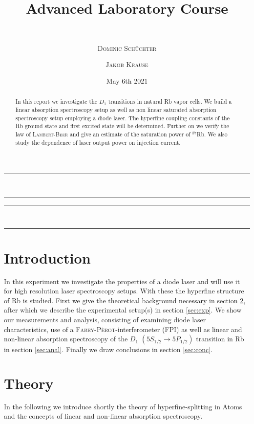 \documentclass[11pt,a4paper,notitlepage]{scrartcl}
\title{ Advanced Laboratory Course}
\subtitle{\name  \\ \hrulefill}
\date{May 6th 2021 \\}
\author[*]{\textsc{Dominic Schüchter}}
\author[$\dagger$]{\textsc{Jakob Krause}}
\affil[*]{\href{mailto:dschuechter@uni-bonn.de}{\faEnvelope  \hspace*{0.1cm}\texttt{dschuechter@uni-bonn.de}} {\color{black}$|$} \href{https://github.com/dschuechter}{\faGithub  \hspace*{0.1cm}\texttt{dschuechter}}}
\affil[$\dagger$]{\href{mailto:krause.jakob@uni-bonn.de}{\faEnvelope  \hspace*{0.1cm}\texttt{krause.jakob@uni-bonn.de}} {\color{black}$|$} \href{https://github.com/krausejm}{\faGithub  \hspace*{0.1cm}\texttt{krausejm}}}
\begin{document}
\maketitle
\vspace{-.8cm}
\thispagestyle{empty}
\begin{center}

\vspace{-.2cm}

\rule{12cm}{1pt} \\\vspace{-.6cm} \rule{10cm}{1pt}
\end{center}



\begin{abstract}
	In this report we investigate the $D_1$ transitions in natural Rb vapor cells. We build a linear absorption spectroscopy setup as well as non linear saturated absorption spectroscopy setup employing a diode laser. The hyperfine coupling constants of the Rb ground state and first excited state will be determined. Further on we verify the law of \textsc{Lambert-Beer} and give an estimate of the saturation power of $^{87}$Rb. We also study the dependence of laser output power on injection current.
\end{abstract}
\begin{center}
	 \rule{10cm}{1pt} \\\vspace{-.7cm} \rule{12cm}{1pt}
\end{center}

\setcounter{page}{-1}
\newpage

\tableofcontents
\thispagestyle{empty}
\newpage
\section{Introduction}
In this experiment we investigate the properties of a diode laser and will use it for high resolution laser spectroscopy setups. With these the hyperfine structure of Rb is studied. First we give the theoretical background necessary in section \ref{sec:theory}, after which we describe the experimental setup(s) in section \ref{sec:exp}. We show our measurements and analysis, consisting of examining diode laser characteristics, use of a \textsc{Fabry-Pèrot}-interferometer (FPI) as well as linear and non-linear absorption spectroscopy of the $D_1$ $(5S_{1/2}\to5{P_{1/2}})$ transition in Rb in section \ref{sec:anal}. Finally we draw conclusions in section \ref{sec:conc}.
\newpage
\section{Theory}
\label{sec:theory}
In the following we introduce shortly the theory of hyperfine-splitting in Atoms and the concepts of linear and non-linear absorption spectroscopy.
\end{document}
